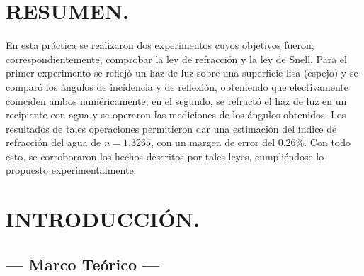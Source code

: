 \documentclass[12pt,a4paper]{article}
\begin{document}
\portada

\section{RESUMEN.} %
En esta práctica se realizaron dos experimentos cuyos objetivos fueron, correspondientemente, comprobar la ley de refracción y la ley de Snell. Para el primer experimento se reflejó un haz de luz sobre una superficie lisa (espejo) y se comparó los ángulos de incidencia y de reflexión, obteniendo que efectivamente coinciden ambos numéricamente; en el segundo, se refractó el haz de luz en un recipiente con agua y se operaron las mediciones de los ángulos obtenidos. Los resultados de tales operaciones permitieron dar una estimación del índice de refracción del agua de $n=1.3265$, con un margen de error del $0.26$\textsc{\%}. Con todo esto, se corroboraron los hechos descritos por tales leyes, cumpliéndose lo propuesto experimentalmente.

\section{INTRODUCCIÓN.} %

\subsection{--- Marco Teórico ---} %
\end{document}
